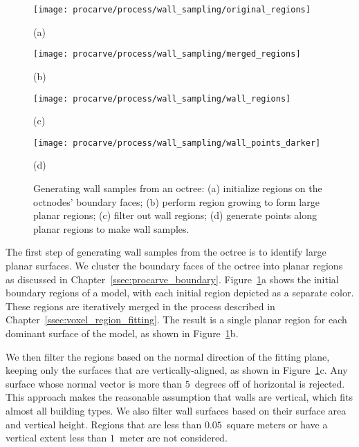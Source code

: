 \documentclass[12pt,onecolumn,oneside]{book}
\begin{document}
\begin{figure}
	\begin{minipage}[t]{0.45\linewidth}
		\centerline{\texttt{[image: procarve/process/wall\_sampling/original\_regions]}}
		\centerline{(a)}
	\end{minipage}
	\hfill
	\begin{minipage}[t]{0.45\linewidth}
		\centerline{\texttt{[image: procarve/process/wall\_sampling/merged\_regions]}}
		\centerline{(b)}
	\end{minipage}
	

	\begin{minipage}[t]{0.45\linewidth}
		\centerline{\texttt{[image: procarve/process/wall\_sampling/wall\_regions]}}
		\centerline{(c)}
	\end{minipage}
	\hfill
	\begin{minipage}[t]{0.45\linewidth}
		\centerline{\texttt{[image: procarve/process/wall\_sampling/wall\_points\_darker]}}
		\centerline{(d)}
	\end{minipage}

	\caption[Generating wall samples from an octree.]{Generating wall samples from an octree: (a) initialize regions on the octnodes' boundary faces; (b) perform region growing to form large planar regions; (c) filter out wall regions; (d) generate points along planar regions to make wall samples.}
	\label{fig:oct2dq}
\end{figure}

The first step of generating wall samples from the octree is to identify large planar surfaces.  We cluster the boundary faces of the octree into planar regions as discussed in Chapter~\ref{ssec:procarve_boundary}.  Figure~\ref{fig:oct2dq}a shows the initial boundary regions of a model, with each initial region depicted as a separate color.  These regions are iteratively merged in the process described in Chapter~\ref{ssec:voxel_region_fitting}.  The result is a single planar region for each dominant surface of the model, as shown in Figure~\ref{fig:oct2dq}b.  

We then filter the regions based on the normal direction of the fitting plane, keeping only the surfaces that are vertically-aligned, as shown in Figure~\ref{fig:oct2dq}c.  Any surface whose normal vector is more than $5$~degrees off of horizontal is rejected.  This approach makes the reasonable assumption that walls are vertical, which fits almost all building types.  We also filter wall surfaces based on their surface area and vertical height.  Regions that are less than $0.05$~square meters or have a vertical extent less than $1$~meter are not considered.
\end{document}
